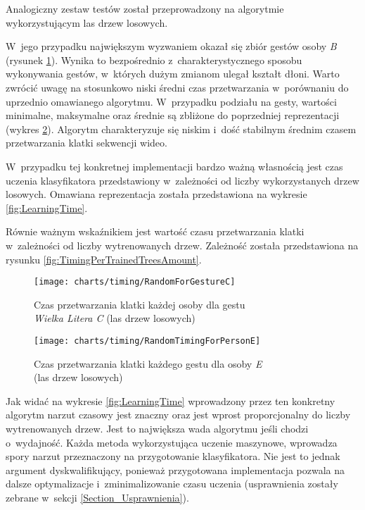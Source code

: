     Analogiczny zestaw testów został przeprowadzony na algorytmie wykorzystującym las drzew losowych.

    W~jego przypadku największym wyzwaniem okazał się zbiór gestów osoby \textit{B} (rysunek \ref{fig:RandomForGestureC}). Wynika to bezpośrednio z~charakterystycznego sposobu wykonywania gestów, w~których dużym zmianom ulegał kształt dłoni. Warto zwrócić uwagę na stosunkowo niski średni czas przetwarzania w~porównaniu do uprzednio omawianego algorytmu. W~przypadku podziału na gesty, wartości minimalne, maksymalne oraz średnie są zbliżone do poprzedniej reprezentacji (wykres \ref{fig:RandomTimingForPersonE}). Algorytm charakteryzuje się niskim i~dość stabilnym średnim czasem przetwarzania klatki sekwencji wideo.

    W~przypadku tej konkretnej implementacji bardzo ważną własnością jest czas uczenia klasyfikatora przedstawiony w~zależności od liczby wykorzystanych drzew losowych. Omawiana reprezentacja została przedstawiona na wykresie \ref{fig:LearningTime}.

    Równie ważnym wskaźnikiem jest wartość czasu przetwarzania klatki w~zależności od liczby wytrenowanych drzew. Zależność została przedstawiona na rysunku \ref{fig:TimingPerTrainedTreesAmount}.

    \newpage
      \begin{figure}[!ht]
        \centering
        \texttt{[image: charts/timing/RandomForGestureC]}
        \caption[Czas przetwarzania klatki każdej osoby dla gestu C (las drzew losowych)]
                {Czas przetwarzania klatki każdej osoby dla gestu\\\textit{Wielka Litera C} (las drzew losowych)}
        \label{fig:RandomForGestureC}
      \end{figure}

      \begin{figure}[!ht]
        \centering
        \texttt{[image: charts/timing/RandomTimingForPersonE]}
        \caption[Czas przetwarzania klatki każdego gestu dla osoby E (las drzew losowych)]
                {Czas przetwarzania klatki każdego gestu dla osoby \textit{E}\\(las drzew losowych)}
        \label{fig:RandomTimingForPersonE}
      \end{figure}

    \newpage
    Jak widać na wykresie \ref{fig:LearningTime} wprowadzony przez ten konkretny algorytm narzut czasowy jest znaczny oraz jest wprost proporcjonalny do liczby wytrenowanych drzew. Jest to największa wada algorytmu jeśli chodzi o~wydajność. Każda metoda wykorzystująca uczenie maszynowe, wprowadza spory narzut przeznaczony na przygotowanie klasyfikatora. Nie jest to jednak argument dyskwalifikujący, ponieważ przygotowana implementacja pozwala na dalsze optymalizacje i~zminimalizowanie czasu uczenia (usprawnienia zostały zebrane w~sekcji \ref{Section_Usprawnienia}).

